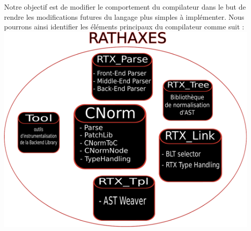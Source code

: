 \documentclass{rtxreport}
\begin{document}
\hbox{}
Notre objectif est de modifier le comportement du compilateur dans le but de
rendre les modifications futures du langage plus simples à implémenter.
Nous pourrons ainsi identifier les éléments principaux du compilateur comme
suit :
\includegraphics[width=0.95\textwidth]{diagramme_architecture.pdf}
\end{document}

